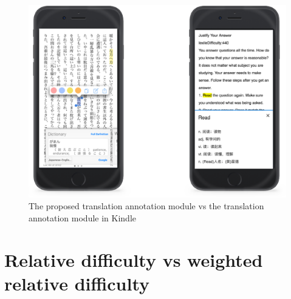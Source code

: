 \begin{figure}[tbp]
 \begin{center}
  \includegraphics[width=120mm]{comparison_proposed_kindle.eps}
 \end{center}
 \caption{\label{figure:translation_module_vs_kindle} The proposed translation annotation module vs the translation annotation module in Kindle}
\end{figure}

\section{Relative difficulty vs weighted relative difficulty}

